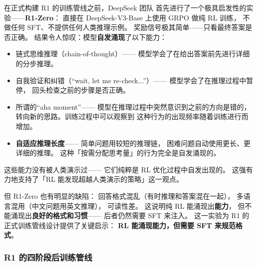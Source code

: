 在正式构建 R1 的训练管线之前，DeepSeek 团队
首先进行了一个极具启发性的实验——\textbf{R1-Zero}：
直接在 DeepSeek-V3-Base 上使用 GRPO 做纯 RL 训练，
不做任何 SFT、不提供任何人类推理示例。
奖励信号极其简单——只看最终答案是否正确。
结果令人惊叹：模型\textbf{自发涌现}了以下能力：
\begin{itemize}[noitemsep]
  \item 链式思维推理（chain-of-thought）——
        模型学会了在给出答案前先进行详细的分步推理。
  \item 自我验证和纠错（``wait, let me re-check...''）——
        模型学会了在推理过程中暂停，
        回头检查之前的步骤是否正确。
  \item 所谓的``aha moment''——
        模型在推理过程中突然意识到之前的方向是错的，
        转向新的思路。训练过程中可以观察到
        这种行为的出现频率随着训练进行而增加。
  \item \textbf{自适应推理长度}——
        简单问题用较短的推理链，
        困难问题自动使用更长、更详细的推理。
        这种「按需分配思考量」的行为完全是自发涌现的。
\end{itemize}

这些能力没有被人类演示过——
它们纯粹是 RL 优化过程中自发出现的。
这强有力地支持了「RL 能发现超越人类演示的策略」这一观点。

但 R1-Zero 也有明显的缺陷：
回答格式混乱（有时推理和答案混在一起），
多语言混用（中文问题用英文推理），
可读性差。
这说明纯 RL 能涌现出\textbf{能力}，
但不能涌现出\textbf{良好的格式和习惯}——
后者仍然需要 SFT 来注入。
这一实验为 R1 的正式训练管线设计提供了关键启示：
\textbf{RL 能涌现能力，但需要 SFT 来规范格式}。

\subsubsection{R1 的四阶段后训练管线}

